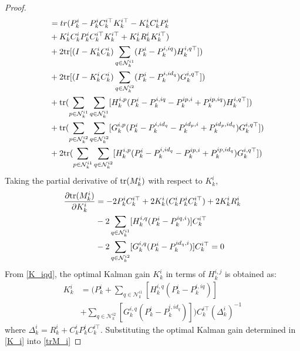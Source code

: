 \documentclass[twocolumn]{IEEEtran}
\newcommand{\tr}{{\rm tr}}
\begin{document}
\begin{proof}
\begin{equation}
\begin{split}
&=tr(P_{k}^{i}-P_{k}^{i}C_{k}^{i\top} K_{k}^{i\top}-K_{k}^{i}C_{k}^{i}P_{k}^{i}\\
\quad&+K_{k}^{i}C_{k}^{i}P_{k}^{i}C_{k}^{i\top} K_{k}^{i\top}+K_{k}^{i}R_{k}^iK_{k}^{i\top})\\
\quad&+2\tr[(I-K_{k}^{i}C_{k}^{i})\sum_{q\in\mathcal{N}_{k}^{i1}}(P_{k}^{i}-P_{k}^{i,iq})H_{k}^{i,q\top}])\\
\quad&+2\tr[(I-K_{k}^{i}C_{k}^{i})\sum_{q\in\mathcal{N}_{k}^{i2}}(P_{k}^{i}-P_{k}^{i,id_q})G_{k}^{i,q\top}])\\
\quad&+\tr(\sum_{p\in\mathcal{N}_{k}^{i1}}\sum_{q\in\mathcal{N}_{k}^{i1}}[H_{k}^{i,p}(P_{k}^{i}-P_{k}^{i,iq}-P_{k}^{ip,i}+P_{k}^{ip,iq})H_{k}^{i,q\top}])\\
\quad&+\tr(\sum_{p\in\mathcal{N}_{k}^{i2}}\sum_{q\in\mathcal{N}_{k}^{i2}}[G_{k}^{i,p}(P_{k}^{i}-P_{k}^{i,id_q}-P_{k}^{id_p,i}+P_{k}^{id_p,id_q})G_{k}^{i,q\top}])\\
\quad&+2\tr(\sum_{p\in\mathcal{N}_{k}^{i1}}\sum_{q\in\mathcal{N}_{k}^{i2}}[H_{k}^{i,p}(P_{k}^{i}-P_{k}^{i,id_q}-P_{k}^{ip,i}+P_{k}^{ip,id_q})G_{k}^{i,q\top}])\\
\end{split}
\end{equation}
Taking the partial derivative of $\tr(M_{k}^{i})$ with respect to $K_{k}^i$,
\begin{equation}\label{K_iqd}
\begin{split}
\frac{\partial\tr(M_{k}^i)}{\partial K_{k}^{i}}&=-2P_{k}^{i}C_{k}^{i\top}+2K_{k}^{i}(C_{k}^{i}P_{k}^{i}C_{k}^{i\top})+2K_{k}^{i}R_{k}^{i}\\
\quad&-2\sum_{q\in\mathcal{N}_{k}^{i1}}[H_{k}^{i,q}(P_{k}^{i}-P_{k}^{iq,i})]C_{k}^{i\top}\\
\quad&-2\sum_{q\in\mathcal{N}_{k}^{i2}}[G_{k}^{i,q}(P_{k}^{i}-P_{k}^{id_q,i})]C_{k}^{i\top}=0
\end{split}
\end{equation}
From \eqref{K_iqd}, the optimal Kalman gain $K_{k}^i$ in terms of $H_{k}^{i,j}$ is obtained as:
\begin{equation}\label{K_i}
\begin{split}
K_{k}^{i}&=(P_{k}^{i}+\sum_{q\in\mathcal{N}_{k}^{i1}}[H_{k}^{i,q}(P_{k}^{i}-P_{k}^{i,iq})]\\
\quad&+\sum_{q\in\mathcal{N}_{k}^{i2}}[G_{k}^{i,q}(P_{k}^{i}-P_{k}^{i,id_q})])C_{k}^{i\top}(\Delta_{k}^{i})^{-1}
\end{split}
\end{equation}
where $\Delta_{k}^{i}=R_{k}^{i}+C_{k}^{i}P_{k}^{i}C_{k}^{i\top}$. Substituting the optimal Kalman gain determined in \eqref{K_i} into \eqref{trM_i}

\end{proof}
\end{document}
